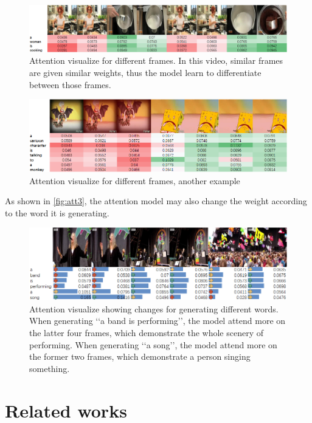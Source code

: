 \begin{figure}
\centering
\includegraphics[width=14cm]{resources/att1.png}
\caption{Attention visualize for different frames. In this video, similar frames are given similar weights, thus the model learn to differentiate between those frames.}
\label{fig:att1}
\end{figure}

\begin{figure}
\centering
\includegraphics[width=14cm]{resources/att2.png}
\caption{Attention visualize for different frames, another example}
\label{fig:att2}
\end{figure}

As shown in \autoref{fig:att3}, the attention model may also change the weight according to the word it is generating.

\begin{figure}
\centering
\includegraphics[width=14cm]{resources/att3.png}
\caption{Attention visualize showing changes for generating different words. When generating \lq{}\lq{}a band is performing\rq{}\rq{}, the model attend more on the latter four frames, which demonstrate the whole scenery of performing. When generating \lq{}\lq{}a song\rq{}\rq{}, the model attend more on the former two frames, which demonstrate a person singing something.}
\label{fig:att3}
\end{figure}

\section{Related works}
